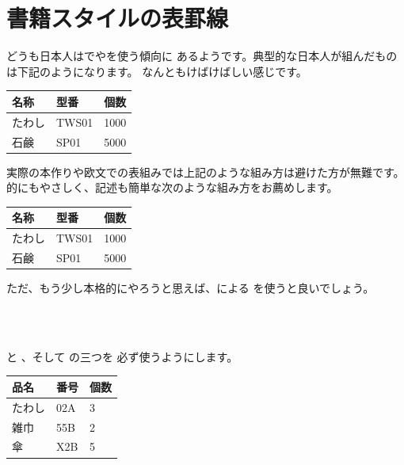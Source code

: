 \section{書籍スタイルの表罫線\texorpdfstring{\zdash}{---}}

どうも日本人はでやを使う傾向に
あるようです。典型的な日本人が組んだものは下記のようになります。
なんともけばけばしい感じです。
\begin{InOut}
\begin{tabular}{|l||l|l|}
 \hline
 名称   & 型番  & 個数 \\
 \hline \hline
 たわし & TWS01 & 1000 \\
 \hline
 石鹸   & SP01  & 5000 \\
 \hline
\end{tabular}
\end{InOut}
実際の本作りや欧文での表組みでは上記のような組み方は避けた方が無難です。
的にもやさしく、記述も簡単な次のような組み方をお薦めします。
\begin{InOut}
\begin{tabular}{lll}
 \hline
 名称   & 型番  & 個数 \\
 \hline
 たわし & TWS01 & 1000 \\
 石鹸   & SP01  & 5000 \\
 \hline
\end{tabular}
\end{InOut}
ただ、もう少し本格的にやろうと思えば、による
 を使うと良いでしょう。
\begin{Syntax}
 \\
 \\
 
\end{Syntax}
 と 、そして  の三つを
必ず使うようにします。
\begin{InOut}
\begin{tabular}{lll}
\toprule
品名 & 番号 & 個数 \\
\midrule
たわし & 02A & 3 \\
雑巾   & 55B & 2 \\
傘     & X2B & 5 \\
\bottomrule
\end{tabular}
\end{InOut}

